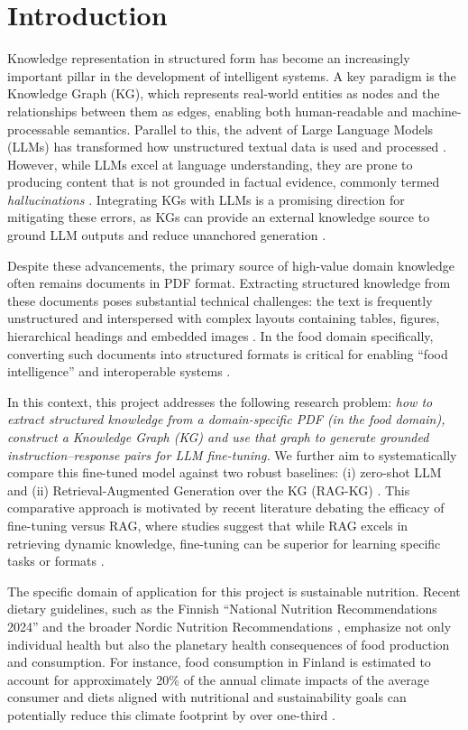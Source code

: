 \section{Introduction}

Knowledge representation in structured form has become an increasingly important pillar in the development of intelligent systems. A key paradigm is the Knowledge Graph (KG), which represents real-world entities as nodes and the relationships between them as edges, enabling both human-readable and machine-processable semantics. Parallel to this, the advent of Large Language Models (LLMs) \cite{llmdefinition} has transformed how unstructured textual data is used and processed \cite{llm_impact}. However, while LLMs excel at language understanding, they are prone to producing content that is not grounded in factual evidence, commonly termed \textit{hallucinations} \cite{2023survey}. Integrating KGs with LLMs is a promising direction for mitigating these errors, as KGs can provide an external knowledge source to ground LLM outputs and reduce unanchored generation \cite{unifyingllmkg}.

Despite these advancements, the primary source of high-value domain knowledge often remains documents in PDF format. Extracting structured knowledge from these documents poses substantial technical challenges: the text is frequently unstructured and interspersed with complex layouts containing tables, figures, hierarchical headings and embedded images \cite{challengesExtract}. In the food domain specifically, converting such documents into structured formats is critical for enabling ``food intelligence'' and interoperable systems \cite{foodrecognition}.

In this context, this project addresses the following research problem: \textit{how to extract structured knowledge from a domain-specific PDF (in the food domain), construct a Knowledge Graph (KG) and use that graph to generate grounded instruction--response pairs for LLM fine-tuning.} We further aim to systematically compare this fine-tuned model against two robust baselines: (i) zero-shot LLM \cite{llmzeroshot} and (ii) Retrieval-Augmented Generation over the KG (RAG-KG) \cite{whatRAG} \cite{RAGsurvey}. This comparative approach is motivated by recent literature debating the efficacy of fine-tuning versus RAG, where studies suggest that while RAG excels in retrieving dynamic knowledge, fine-tuning can be superior for learning specific tasks or formats \cite{finetuning}.

The specific domain of application for this project is sustainable nutrition. Recent dietary guidelines, such as the Finnish ``National Nutrition Recommendations 2024'' \cite{thl2024nutrition} and the broader Nordic Nutrition Recommendations \cite{blomhoff2023nordic}, emphasize not only individual health but also the planetary health consequences of food production and consumption. For instance, food consumption in Finland is estimated to account for approximately 20\% of the annual climate impacts of the average consumer and diets aligned with nutritional and sustainability goals can potentially reduce this climate footprint by over one-third \cite{thl2024nutrition}.

